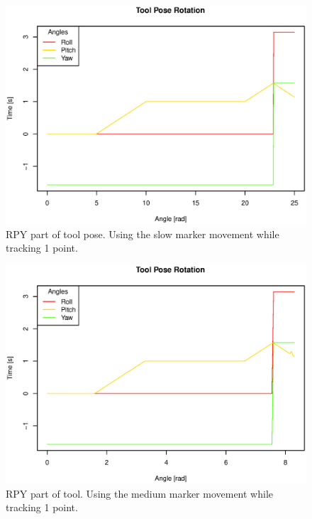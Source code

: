 \begin{figure}[H]
\centering
\includegraphics[width= \fullImageWidth]{graphics/robotics/toolPose_slow_1pt}
\caption{RPY part of tool pose. Using the slow marker movement while tracking 1 point.}
\label{fig:toolpose_slow_1p_rpy}
\end{figure}

\begin{figure}[H]
\centering
\includegraphics[width= \fullImageWidth]{graphics/robotics/toolPose_medium_1pt}
\caption{RPY part of tool. Using the medium marker movement while tracking 1 point.}
\label{fig:toolpose_medium_1p_rpy}
\end{figure}


